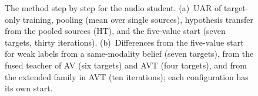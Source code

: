 \begin{figure}[t]
\centering
{}
\caption{The method step by step for the audio student. (a)~UAR of target-only training, pooling (mean over single sources), hypothesis transfer from the pooled sources (HT), and the five-value start (seven targets, thirty iterations). (b)~Differences from the five-value start for weak labels from a same-modality belief (seven targets), from the fused teacher of AV (six targets) and AVT (four targets), and from the extended family in AVT (ten iterations); each configuration has its own start.}
\label{fig:ladder}
\end{figure}
